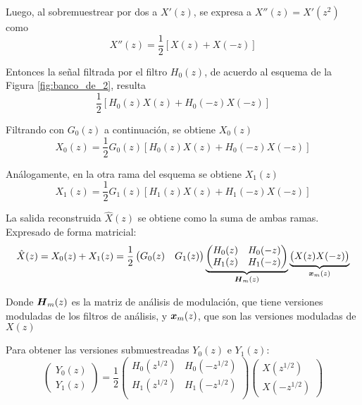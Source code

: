 	Luego, al sobremuestrear por dos a $X'(z)$, se expresa a $X''(z)=X'(z^2)$ como
		\begin{equation}
			X''(z)=\frac{1}{2}[X(z)+X(-z)]
		\end{equation}

	Entonces la señal filtrada por el filtro $H_0(z)$, de acuerdo al esquema de la Figura \ref{fig:banco_de_2}, resulta
		\begin{equation}
			\frac{1}{2}[H_0(z)X(z)+H_0(-z)X(-z)]
		\end{equation}

	Filtrando con $G_0(z)$ a continuación, se obtiene $X_0(z)$
		\begin{equation}
			X_0(z)=\frac{1}{2}G_0(z)[H_0(z)X(z)+H_0(-z)X(-z)]
		\end{equation}

	Análogamente, en la otra rama del esquema se obtiene $X_1(z)$
		\begin{equation}
			X_1(z)=\frac{1}{2}G_1(z)[H_1(z)X(z)+H_1(-z)X(-z)]
		\end{equation}

	La salida reconstruida $\hat{X}(z)$ se obtiene como la suma de ambas ramas. Expresado de forma matricial:
		\begin{equation}
			\hat{X}(z)
			=
			X_0(z)+X_1(z)
			=
			\frac{1}{2}
			\begin{pmatrix}
				G_0(z) & G_1(z)
			\end{pmatrix}
			\underbrace{
				\begin{pmatrix}
					H_0(z) & H_0(-z) \\
					H_1(z) & H_1(-z)
				\end{pmatrix}
			}_{\boldsymbol{H}_m(z)}
			\underbrace{
				\begin{pmatrix}
					X(z) X(-z)
				\end{pmatrix}
			}_{\boldsymbol{x}_m(z)}
		\label{eq:modmat}
		\end{equation}

	Donde $\boldsymbol{H}_m(z)$ es la matriz de análisis de modulación, que tiene versiones moduladas de los filtros de análisis, y $\boldsymbol{x}_m(z)$, que son las versiones moduladas de $X(z)$


	Para obtener las versiones submuestreadas $Y_0(z)$ e $Y_1(z)$:
		\begin{equation}
			\begin{pmatrix}
				Y_0(z) \\
				Y_1(z)
			\end{pmatrix}
			=
			\frac{1}{2}
			\begin{pmatrix}
				H_0(z^{1/2}) & H_0(-z^{1/2}) \\
				H_1(z^{1/2}) & H_1(-z^{1/2}) \\
			\end{pmatrix}
			\begin{pmatrix}
				X(z^{1/2}) \\
				X(-z^{1/2})
			\end{pmatrix}
		\end{equation}
	
